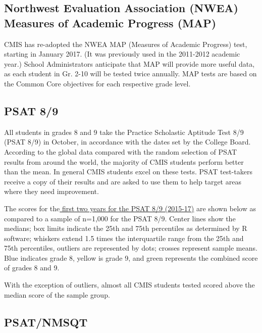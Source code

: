 
\subsection{Northwest Evaluation Association (NWEA) Measures of Academic Progress (MAP)}

CMIS has re-adopted the NWEA MAP (Measures of Academic Progress) test, starting in January 2017. (It was previously used in the 2011-2012 academic year.)  School Administrators anticipate that MAP will provide more useful data, as each student in Gr. 2-10 will be tested twice annually.  MAP tests are based on the Common Core objectives for each respective grade level.  

\subsection{PSAT 8/9}

All students in grades 8 and 9 take the Practice Scholastic Aptitude Test 8/9 (PSAT 8/9) in October, in accordance with the dates set by the College Board. According to the global data compared with the random selection of PSAT results from around the world, the majority of CMIS students perform better than the mean. In general CMIS students excel on these tests.   PSAT test-takers receive a copy of their results and are asked to use them to help target areas where they need improvement.  

The scores for the\href{https://docs.google.com/a/cmis.ac.th/spreadsheets/d/1OVMnw4x1eUg-QByMt2J2IZJkovZGys_8uoj1SKSM2As/edit?usp=sharing}{ first two years for the PSAT 8/9 (2015-17)} are shown below as compared to a sample of n=1,000 for the PSAT 8/9.  Center lines show the medians; box limits indicate the 25th and 75th percentiles as determined by R software; whiskers extend 1.5 times the interquartile range from the 25th and 75th percentiles, outliers are represented by dots; crosses represent sample means. Blue indicates grade 8, yellow is grade 9, and green represents the combined score of grades 8 and 9.  

With the exception of outliers, almost all CMIS students tested scored above the median score of the sample group.  


\subsection{PSAT/NMSQT}

